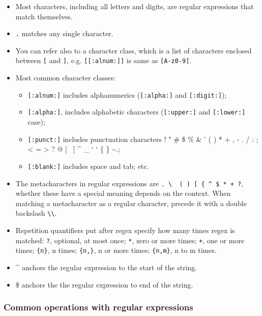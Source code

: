 \documentclass[]{book}
\providecommand{\tightlist}{%
  \setlength{\itemsep}{0pt}\setlength{\parskip}{0pt}}
\begin{document}
\begin{itemize}
\tightlist
\item
  Most characters, including all letters and digits, are regular
  expressions that match themselves.
\item
  \texttt{.} matches any single character.
\item
  You can refer also to a character class, which is a list of characters
  enclosed between \texttt{{[}} and \texttt{{]}}, e.g.
  \texttt{{[}{[}:alnum:{]}{]}} is same as \texttt{{[}A-z0-9{]}}.
\item
  Most common character classes:

  \begin{itemize}
  \tightlist
  \item
    \texttt{{[}:alnum:{]}} includes alphanumerics
    (\texttt{{[}:alpha:{]}} and \texttt{{[}:digit:{]}});
  \item
    \texttt{{[}:alpha:{]}}, includes alphabetic characters
    (\texttt{{[}:upper:{]}} and \texttt{{[}:lower:{]}} case);
  \item
    \texttt{{[}:punct:{]}} includes punctuation characters ! " \# \$ \%
    \& ' ( ) * + , - . / : ; \textless{} = \textgreater{} ? @ {[} ~{]}
    \^{} \_ ` ` \{ \textbar{} \} \textasciitilde{}.;
  \item
    \texttt{{[}:blank:{]}} includes space and tab; etc.
  \end{itemize}
\item
  The metacharacters in regular expressions are
  \texttt{.\ \textbackslash{}\ \textbar{}\ (\ )\ {[}\ \{\ \^{}\ \$\ *\ +\ ?},
  whether these have a special meaning depends on the context. When
  matching a metacharacter as a regular character, precede it with a
  double backslash \texttt{\textbackslash{}\textbackslash{}}.
\item
  Repetition quantifiers put after regex specify how many times regex is
  matched: \texttt{?}, optional, at most once; \texttt{*}, zero or more
  times; \texttt{+}, one or more times; \texttt{\{n\}}, n times;
  \texttt{\{n,\}}, n or more times; \texttt{\{n,m\}}, n to m times.
\item
  \^{} anchors the regular expression to the start of the string.
\item
  \$ anchors the the regular expression to end of the string.
\end{itemize}

\subsubsection{Common operations with regular
expressions}\label{common-operations-with-regular-expressions}
\end{document}
